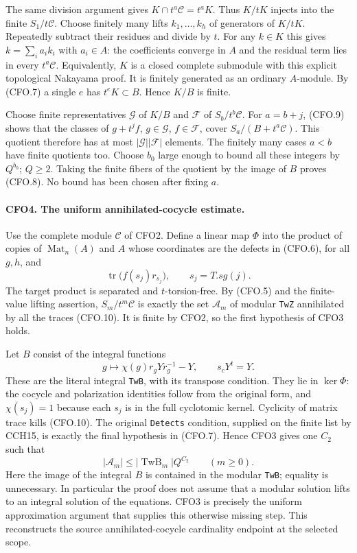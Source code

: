 The same division argument gives
$K\cap t^a\mathcal C=t^aK$.  Thus $K/tK$ injects into the finite
$S_1/t\mathcal C$.  Choose finitely many lifts $k_1,\ldots,k_h$
of generators of $K/tK$.  Repeatedly subtract their residues and
divide by $t$.  For any $k\in K$ this gives
$k=\sum_i a_i k_i$ with $a_i\in A$: the coefficients converge
in $A$ and the residual term lies in every $t^a\mathcal C$.
Equivalently, $K$ is a closed complete submodule with this
explicit topological Nakayama proof.  It is finitely generated
as an ordinary $A$-module.  By (CFO.7) a single $e$ has
$t^eK\subset B$.  Hence $K/B$ is finite.

Choose finite representatives $\mathcal G$ of $K/B$ and
$\mathcal F$ of $S_b/t^b\mathcal C$.  For $a=b+j$, (CFO.9)
shows that the classes of
$g+t^j f$, $g\in\mathcal G$, $f\in\mathcal F$, cover
$S_a/(B+t^a\mathcal C)$.  This quotient therefore has at most
$|\mathcal G||\mathcal F|$ elements.  The finitely many cases
$a<b$ have finite quotients too.  Choose $b_0$ large enough to
bound all these integers by $Q^{b_0}$; $Q\ge2$.  Taking the
finite fibers of the quotient by the image of $B$ proves
(CFO.8).  No bound has been chosen after fixing $a$.

\paragraph{CFO4. The uniform annihilated-cocycle estimate.}
\label{claim:CFO4}
Use the complete module $\mathcal C$ of CFO2.  Define a linear
map $\Phi$ into the product of copies of $\operatorname{Mat}_n(A)$
and $A$ whose coordinates are the defects in (CFO.6), for all
$g,h$, and
\[
 \operatorname{tr}\bigl(f(s_j)r_{s_j}\bigr),\qquad s_j=T.sg(j).
                                                                    \tag{CFO.10}
\]
The target product is separated and $t$-torsion-free.  By (CFO.5)
and the finite-value lifting assertion, $S_m/t^m\mathcal C$ is
exactly the set $\mathcal A_m$ of modular \texttt{TwZ} annihilated
by all the traces (CFO.10).  It is finite by CFO2, so the first
hypothesis of CFO3 holds.

Let $B$ consist of the integral functions
\[
 g\longmapsto\chi(g)r_gYr_g^{-1}-Y,\qquad s_cY^t=Y.               \tag{CFO.11}
\]
These are the literal integral \texttt{TwB}, with its transpose
condition.  They lie in $\ker\Phi$: the cocycle and polarization
identities follow from the original form, and $\chi(s_j)=1$
because each $s_j$ is in the full cyclotomic kernel.  Cyclicity
of matrix trace kills (CFO.10).  The original \texttt{Detects}
condition, supplied on the finite list by CCH15, is exactly
the final hypothesis in (CFO.7).  Hence CFO3 gives one $C_2$
such that
\[
 |\mathcal A_m|\le|\operatorname{TwB}_m|Q^{C_2}
 \qquad(m\ge0).                                                  \tag{CFO.12}
\]
Here the image of the integral $B$ is contained in the modular
\texttt{TwB}; equality is unnecessary.  In particular the proof
does not assume that a modular solution lifts to an integral
solution of the equations.  CFO3 is precisely the uniform
approximation argument that supplies this otherwise missing
step.  This reconstructs the source annihilated-cocycle
cardinality endpoint at the selected scope.

